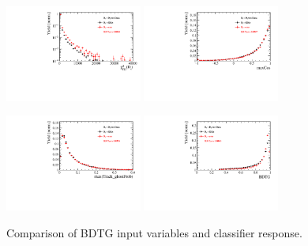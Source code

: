 \begin{figure}[h]
\includegraphics[height=!,width=0.4\textwidth]{figs/dataVsMC/finalState_norm/Ds2all_Ds_FDCHI2_ORIVX.pdf}
\includegraphics[height=!,width=0.4\textwidth]{figs/dataVsMC/finalState_norm/Ds2all_maxCos.pdf}

\includegraphics[height=!,width=0.4\textwidth]{figs/dataVsMC/finalState_norm/Ds2all_max_ghostProb.pdf}
\includegraphics[height=!,width=0.4\textwidth]{figs/dataVsMC/finalState_norm/Ds2all_BDTG_response.pdf}

\caption{Comparison of BDTG input variables and classifier response.}
\label{fig:}
\end{figure}
